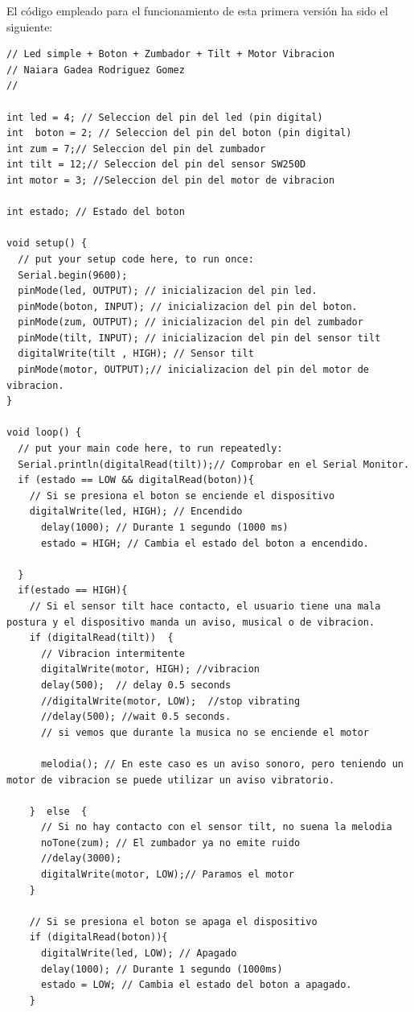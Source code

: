 \newpage
El código empleado para el funcionamiento de esta primera versión ha sido el siguiente:
\begin{lstlisting}
// Led simple + Boton + Zumbador + Tilt + Motor Vibracion
// Naiara Gadea Rodriguez Gomez
// 

int led = 4; // Seleccion del pin del led (pin digital)
int  boton = 2; // Seleccion del pin del boton (pin digital)
int zum = 7;// Seleccion del pin del zumbador
int tilt = 12;// Seleccion del pin del sensor SW250D
int motor = 3; //Seleccion del pin del motor de vibracion

int estado; // Estado del boton

void setup() {
  // put your setup code here, to run once:
  Serial.begin(9600);
  pinMode(led, OUTPUT); // inicializacion del pin led.
  pinMode(boton, INPUT); // inicializacion del pin del boton.
  pinMode(zum, OUTPUT); // inicializacion del pin del zumbador
  pinMode(tilt, INPUT); // inicializacion del pin del sensor tilt
  digitalWrite(tilt , HIGH); // Sensor tilt 
  pinMode(motor, OUTPUT);// inicializacion del pin del motor de vibracion.
}

void loop() {
  // put your main code here, to run repeatedly:
  Serial.println(digitalRead(tilt));// Comprobar en el Serial Monitor.
  if (estado == LOW && digitalRead(boton)){
    // Si se presiona el boton se enciende el dispositivo
    digitalWrite(led, HIGH); // Encendido
      delay(1000); // Durante 1 segundo (1000 ms)
      estado = HIGH; // Cambia el estado del boton a encendido.
    
  }
  if(estado == HIGH){
    // Si el sensor tilt hace contacto, el usuario tiene una mala postura y el dispositivo manda un aviso, musical o de vibracion.
    if (digitalRead(tilt))  {
      // Vibracion intermitente
      digitalWrite(motor, HIGH); //vibracion
      delay(500);  // delay 0.5 seconds
      //digitalWrite(motor, LOW);  //stop vibrating
      //delay(500); //wait 0.5 seconds.
      // si vemos que durante la musica no se enciende el motor
      
      melodia(); // En este caso es un aviso sonoro, pero teniendo un motor de vibracion se puede utilizar un aviso vibratorio.
      
    }  else  {
      // Si no hay contacto con el sensor tilt, no suena la melodia
      noTone(zum); // El zumbador ya no emite ruido
      //delay(3000);
      digitalWrite(motor, LOW);// Paramos el motor
    }

    // Si se presiona el boton se apaga el dispositivo
    if (digitalRead(boton)){
      digitalWrite(led, LOW); // Apagado
      delay(1000); // Durante 1 segundo (1000ms)
      estado = LOW; // Cambia el estado del boton a apagado.
    }
    

\end{lstlisting}
